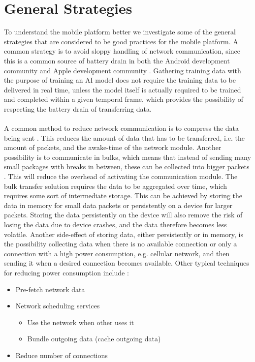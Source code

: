 
\section{General Strategies}
\label{sec:general_strategies}
To understand the mobile platform better we investigate some of the general strategies that are considered to be good practices for the mobile platform. A common strategy is to avoid sloppy handling of network communication, since this is a common source of battery drain in both the Android development community \parencite{android_network_scheduling} and Apple development community \parencite{iphone_network_scheduling}. Gathering training data with the purpose of training an AI model does not require the training data to be delivered in real time, unless the model itself is actually required to be trained and completed within a given temporal frame, which provides the possibility of respecting the battery drain of transferring data. 
\\\\
A common method to reduce network communication is to compress the data being sent \parencite{har_wearables}\parencite{android_network_scheduling}. This reduces the amount of data that has to be transferred, i.e. the amount of packets, and the awake-time of the network module. Another possibility is to communicate in bulks, which means that instead of sending many small packages with breaks in between, these can be collected into bigger packets \parencite{android_network_scheduling}. This will reduce the overhead of activating the communication module. The bulk transfer solution requires the data to be aggregated over time, which requires some sort of intermediate storage. This can be achieved by storing the data in memory for small data packets or persistently on a device for larger packets. Storing the data persistently on the device will also remove the risk of losing the data due to device crashes, and the data therefore becomes less volatile. Another side-effect of storing data, either persistently or in memory, is the possibility collecting data when there is no available connection or only a connection with a high power consumption, e.g. cellular network, and then sending it when a desired connection becomes available. Other typical techniques for reducing power consumption include \parencite{android_network_scheduling}:

\begin{itemize}
	\setlength\itemsep{-0.3em}
    \item Pre-fetch network data
    \item Network scheduling services
    \vspace{-0.8em}
    \begin{itemize}
    	\setlength\itemsep{-0.3em}
    	\item Use the network when other uses it
        \item Bundle outgoing data (cache outgoing data)
    \end{itemize}
    \item Reduce number of connections
\end{itemize}

